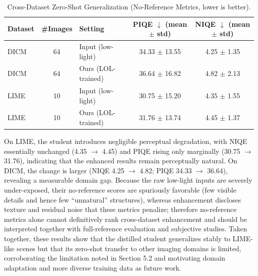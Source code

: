\documentclass[sensors,article,submit,moreauthors]{Definitions/mdpi}
\begin{document}
\begin{table}[H]
\caption{Cross-Dataset Zero-Shot Generalization (No-Reference Metrics, lower is better).\label{tab13}}
\begin{tabularx}{\textwidth}{LCLCC}
\toprule
\textbf{Dataset}	& \textbf{\#Images}	& \textbf{Setting}	& \textbf{PIQE $\downarrow$ (mean $\pm$ std)}	& \textbf{NIQE $\downarrow$ (mean $\pm$ std)}\\
\midrule
DICM \cite{ref30}	& 64	& Input (low-light)	& 34.33 $\pm$ 13.55	& 4.25 $\pm$ 1.35\\
DICM \cite{ref30}	& 64	& Ours (LOL-trained)	& 36.64 $\pm$ 16.82	& 4.82 $\pm$ 2.13\\
LIME \cite{ref31}	& 10	& Input (low-light)	& 30.75 $\pm$ 15.20	& 4.35 $\pm$ 1.55\\
LIME \cite{ref31}	& 10	& Ours (LOL-trained)	& 31.76 $\pm$ 13.74	& 4.45 $\pm$ 1.37\\
\bottomrule
\end{tabularx}
\end{table}

On LIME, the student introduces negligible perceptual degradation, with NIQE essentially unchanged (4.35 $\rightarrow$ 4.45) and PIQE rising only marginally (30.75 $\rightarrow$ 31.76), indicating that the enhanced results remain perceptually natural. On DICM, the change is larger (NIQE 4.25 $\rightarrow$ 4.82; PIQE 34.33 $\rightarrow$ 36.64), revealing a measurable domain gap. Because the raw low-light inputs are severely under-exposed, their no-reference scores are spuriously favorable (few visible details and hence few ``unnatural'' structures), whereas enhancement discloses texture and residual noise that these metrics penalize; therefore no-reference metrics alone cannot definitively rank cross-dataset enhancement and should be interpreted together with full-reference evaluation and subjective studies. Taken together, these results show that the distilled student generalizes stably to LIME-like scenes but that its zero-shot transfer to other imaging domains is limited, corroborating the limitation noted in Section 5.2 and motivating domain adaptation and more diverse training data as future work.
\end{document}
